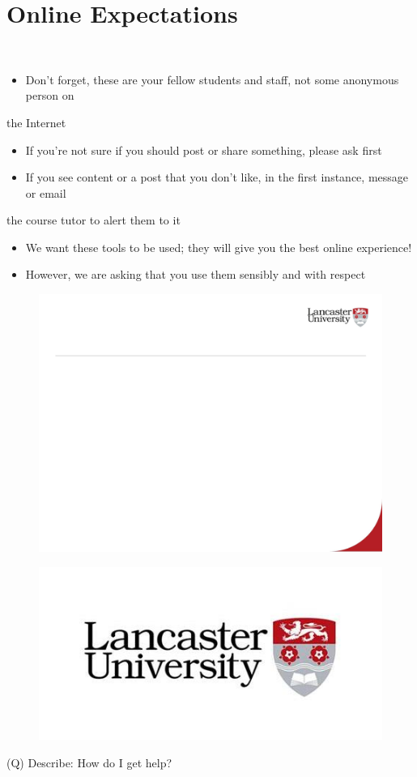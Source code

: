 \documentclass[12pt]{article}
\begin{document}
\section{Online Expectations}
\\
\begin{itemize}
  \item Don’t forget, these are your fellow students and staff, not some anonymous person on 
\end{itemize}
the Internet\\
\begin{itemize}
  \item If you’re not sure if you should post or share something, please ask first
  \item If you see content or a post that you don’t like, in the first instance, message or email 
\end{itemize}
the course tutor to alert them to it\\
\begin{itemize}
  \item We want these tools to be used; they will give you the best online experience!
  \item However, we are asking that you use them sensibly and with respect
\end{itemize}
\begin{figure}[H]
\includegraphics[width=0.5\linewidth]{page14-image-1.png}
\end{figure}
\begin{figure}[H]
\includegraphics[width=0.5\linewidth]{page14-image-2.png}
\end{figure}
\clearpage
(Q)
Describe: How do I get help?
\clearpage
\end{document}
